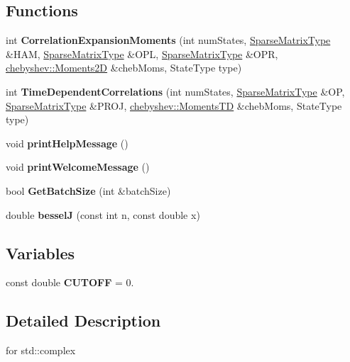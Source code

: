\subsection*{Functions}
\begin{DoxyCompactItemize}
\item 
int {\bfseries Correlation\+Expansion\+Moments} (int num\+States, \hyperlink{class_sparse_matrix_type}{Sparse\+Matrix\+Type} \&H\+AM, \hyperlink{class_sparse_matrix_type}{Sparse\+Matrix\+Type} \&O\+PL, \hyperlink{class_sparse_matrix_type}{Sparse\+Matrix\+Type} \&O\+PR, \hyperlink{classchebyshev_1_1_moments2_d}{chebyshev\+::\+Moments2D} \&cheb\+Moms, State\+Type type)\hypertarget{namespacechebyshev_a41fd86a9b86117955f68bf062f8a57fb}{}\label{namespacechebyshev_a41fd86a9b86117955f68bf062f8a57fb}

\item 
int {\bfseries Time\+Dependent\+Correlations} (int num\+States, \hyperlink{class_sparse_matrix_type}{Sparse\+Matrix\+Type} \&OP, \hyperlink{class_sparse_matrix_type}{Sparse\+Matrix\+Type} \&P\+R\+OJ, \hyperlink{classchebyshev_1_1_moments_t_d}{chebyshev\+::\+Moments\+TD} \&cheb\+Moms, State\+Type type)\hypertarget{namespacechebyshev_a7f597f33a2a06c30c58cd5a98f36ebf4}{}\label{namespacechebyshev_a7f597f33a2a06c30c58cd5a98f36ebf4}

\item 
void {\bfseries print\+Help\+Message} ()\hypertarget{namespacechebyshev_a6bf76a6c5bfc200e1daac580cc72c406}{}\label{namespacechebyshev_a6bf76a6c5bfc200e1daac580cc72c406}

\item 
void {\bfseries print\+Welcome\+Message} ()\hypertarget{namespacechebyshev_ae470c35cceb2f6c5983fc90a4e3ef31f}{}\label{namespacechebyshev_ae470c35cceb2f6c5983fc90a4e3ef31f}

\item 
bool {\bfseries Get\+Batch\+Size} (int \&batch\+Size)\hypertarget{namespacechebyshev_a3a76185bc5ea53bce0dd52284fb46f42}{}\label{namespacechebyshev_a3a76185bc5ea53bce0dd52284fb46f42}

\item 
double {\bfseries besselJ} (const int n, const double x)\hypertarget{namespacechebyshev_a916b45c0463cd5adfdc3b3c28e94e240}{}\label{namespacechebyshev_a916b45c0463cd5adfdc3b3c28e94e240}

\end{DoxyCompactItemize}
\subsection*{Variables}
\begin{DoxyCompactItemize}
\item 
const double {\bfseries C\+U\+T\+O\+FF} = 0.\hypertarget{namespacechebyshev_aad5a801cb70d88a961a694d345d0ee6b}{}\label{namespacechebyshev_aad5a801cb70d88a961a694d345d0ee6b}

\end{DoxyCompactItemize}


\subsection{Detailed Description}
for std\+::complex 